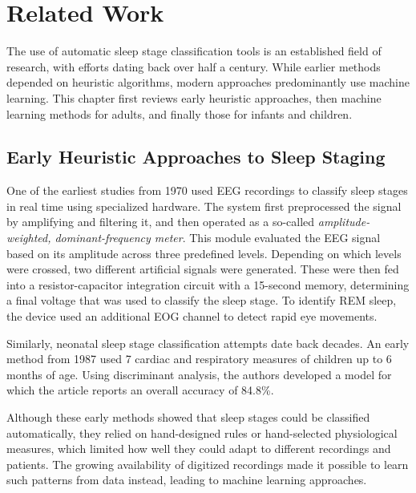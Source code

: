\chapter{Related Work} \label{chapter:related_work}
The use of automatic sleep stage classification tools is an established field of research,
with efforts dating back over half a century. While earlier methods depended on heuristic
algorithms, modern approaches predominantly use machine learning. This chapter first reviews
early heuristic approaches, then machine learning methods for adults, and finally those for infants and children.

\section{Early Heuristic Approaches to Sleep Staging}
One of the earliest studies from 1970 \cite{FROST197088} used EEG recordings to 
classify sleep stages in real time using specialized hardware. The system 
first preprocessed the signal by amplifying and filtering it, and then 
operated as a so-called \textit{amplitude-weighted, dominant-frequency meter}.
This module evaluated the EEG signal based on its amplitude across three
predefined levels. Depending on which levels were crossed, two different
artificial signals were generated. These were then fed into a resistor-capacitor
integration circuit with a 15-second memory, determining a final voltage
that was used to classify the sleep stage. To identify REM sleep, the device
used an additional EOG channel to detect rapid eye movements.

Similarly, neonatal sleep stage classification attempts date back decades.
An early method from 1987 \cite{HARPER1987379} used 7 cardiac and respiratory measures
of children up to 6 months of age. Using discriminant analysis, the authors developed a model 
for which the article reports an overall accuracy of 84.8\%.

Although these early methods showed that sleep stages could be classified automatically,
they relied on hand-designed rules or hand-selected physiological measures, which limited
how well they could adapt to different recordings and patients. The growing availability of
digitized recordings made it possible to learn such patterns from data instead,
leading to machine learning approaches.

